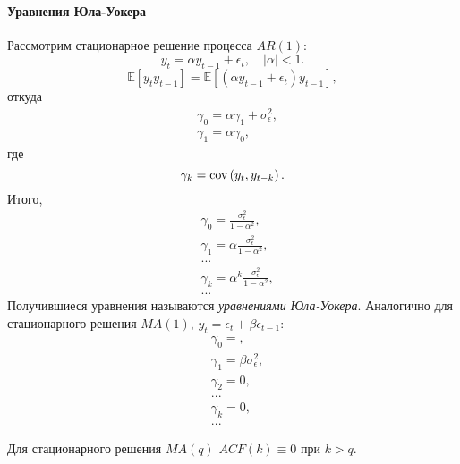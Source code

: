         \paragraph{Уравнения Юла-Уокера}
            Рассмотрим стационарное решение процесса $AR(1)$:
            \begin{equation*}
                y_{t} = \alpha y_{t-1} +\epsilon_t,\quad |\alpha| < 1.
            \end{equation*}
            \begin{equation*}
                \mathbb{E}\left[y_t y_{t-1}\right] = \mathbb{E}\left[(\alpha y_{t-1} +\epsilon_t) y_{t-1}\right],
            \end{equation*}
            откуда
            \begin{align*}
                & \gamma_0 = \alpha \gamma_1 + \sigma_\epsilon^2, \\
                & \gamma_1 = \alpha\gamma_0,
            \end{align*}
            где
            \begin{equation*}
                \gamma_k = \operatorname*{cov}\left(y_t, y_{t-k}\right).
            \end{equation*}
            Итого, 
            \begin{align*}
                & \gamma_0 = \frac{\sigma_\epsilon^2}{1-\alpha^2}, \\
                & \gamma_1 = \alpha\frac{\sigma_\epsilon^2}{1-\alpha^2}, \\
                & ... \\
                & \gamma_k = \alpha^{k}\frac{\sigma_\epsilon^2}{1-\alpha^2}, \\
                & ...
            \end{align*}
            Получившиеся уравнения называются \emph{уравнениями Юла-Уокера}.
            Аналогично для стационарного решения $MA(1)$, $y_t = \epsilon_t + \beta \epsilon_{t-1}$:
            \begin{align*}
                & \gamma_0 = , \\
                & \gamma_1 = \beta\sigma_\epsilon^2, \\
                & \gamma_2 = 0, \\
                & ... \\
                & \gamma_k = 0, \\
                & ...
            \end{align*}

        \begin{proposition}
            Для стационарного решения $MA(q)$ $ACF(k) \equiv 0$ при $k>q$.
        \end{proposition}

